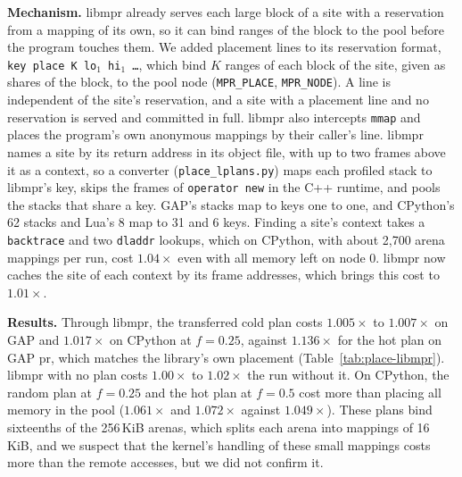 \documentclass[11pt]{article}
\newcommand{\tabref}[1]{Table~\ref{#1}}
\begin{document}
\textbf{Mechanism.} libmpr already serves each large block of a site with a reservation from a mapping of its own, so
it can bind ranges of the block to the pool before the program touches them. We added placement lines to its
reservation format, \texttt{key place K lo$_1$ hi$_1$ \ldots}, which bind $K$ ranges of each block of the site, given as
shares of the block, to the pool node (\texttt{MPR\_PLACE}, \texttt{MPR\_NODE}). A line is independent of the site's
reservation, and a site with a placement line and no reservation is served and committed in full. libmpr also
intercepts \texttt{mmap} and places the program's own anonymous mappings by their caller's line. libmpr names a site by
its return address in its object file, with up to two frames above it as a context, so a converter
(\texttt{place\_lplans.py}) maps each profiled stack to libmpr's key, skips the frames of \texttt{operator new} in the
C++ runtime, and pools the stacks that share a key. GAP's stacks map to keys one to one, and CPython's 62 stacks and
Lua's 8 map to 31 and 6 keys. Finding a site's context takes a \texttt{backtrace} and two \texttt{dladdr} lookups,
which on CPython, with about 2{,}700 arena mappings per run, cost $1.04\times$ even with all memory left on node 0.
libmpr now caches the site of each context by its frame addresses, which brings this cost to $1.01\times$.

\begin{table}[t]
\centering
\small
\caption{Placement through libmpr, plans from the smaller input except ``same 25'': libmpr with no plan over the run
without libmpr (libmpr), and run time with a plan over libmpr with no plan ($\times$), median of 5 runs. Pool share:
the share of the anonymous memory-time on node 1 under the transferred cold plan at $f = 0.25$.}
\label{tab:place-libmpr}
\setlength{\tabcolsep}{3.5pt}

\end{table}

\textbf{Results.} Through libmpr, the transferred cold plan costs $1.005\times$ to $1.007\times$ on GAP and
$1.017\times$ on CPython at $f = 0.25$, against $1.136\times$ for the hot plan on GAP pr, which matches the
library's own placement (\tabref{tab:place-libmpr}). libmpr with no plan costs $1.00\times$ to $1.02\times$ the run
without it. On CPython, the random plan at $f = 0.25$ and the hot plan at $f = 0.5$ cost more than placing all memory in the
pool ($1.061\times$ and $1.072\times$ against $1.049\times$). These plans bind sixteenths of the 256\,KiB arenas, which splits each arena into
mappings of 16\,KiB, and we suspect that the kernel's handling of these small mappings costs more than the remote
accesses, but we did not confirm it.
\end{document}
